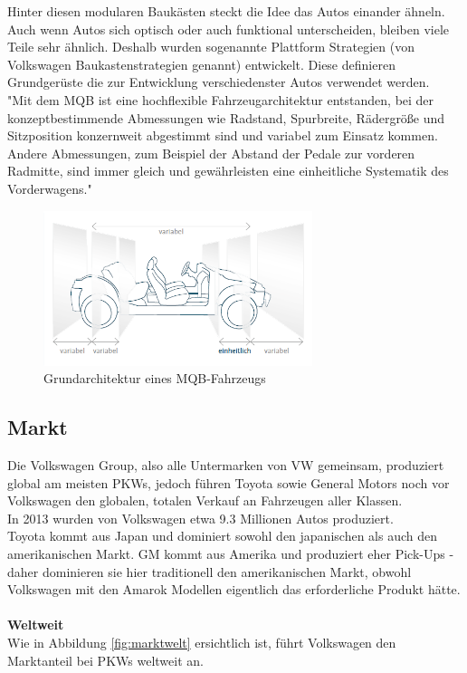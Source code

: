 \documentclass[12pt]{article}
\begin{document}
Hinter diesen modularen Baukästen steckt die Idee das Autos einander ähneln. Auch wenn Autos sich optisch oder auch funktional unterscheiden, bleiben viele Teile sehr ähnlich. Deshalb wurden sogenannte Plattform Strategien (von Volkswagen Baukastenstrategien genannt) entwickelt. Diese definieren Grundgerüste die zur Entwicklung verschiedenster Autos verwendet werden. \\ "Mit dem MQB ist eine hochflexible Fahrzeugarchitektur entstanden, bei der konzeptbestimmende Abmessungen wie Radstand, Spurbreite, Rädergröße und Sitzposition konzernweit abgestimmt sind und variabel zum Einsatz kommen. Andere Abmessungen, zum Beispiel der Abstand der Pedale zur vorderen Radmitte, sind immer gleich und gewährleisten eine einheitliche Systematik des Vorderwagens."\cite{mqb}
\FloatBarrier
\begin{figure}[here!]
	\centering
	\includegraphics[width=0.7\textwidth]{images/MQB2}
	\caption{Grundarchitektur eines MQB-Fahrzeugs \cite{mqbdefault}}
\end{figure}\FloatBarrier
\newpage\newpage
\subsection{Markt}
Die Volkswagen Group, also alle Untermarken von VW gemeinsam, produziert global am meisten PKWs, jedoch führen Toyota sowie General Motors noch vor Volkswagen den globalen, totalen Verkauf an Fahrzeugen aller Klassen. \\
In 2013 wurden von Volkswagen etwa 9.3 Millionen Autos produziert. \\
Toyota kommt aus Japan und dominiert sowohl den japanischen als auch den amerikanischen Markt. GM kommt aus Amerika und produziert eher Pick-Ups - daher dominieren sie hier traditionell den amerikanischen Markt, obwohl Volkswagen mit den Amarok Modellen eigentlich das erforderliche Produkt hätte. 
\\\\\textbf{Weltweit}\\
Wie in Abbildung \ref{fig:marktwelt} ersichtlich ist, führt Volkswagen den Marktanteil bei PKWs weltweit an. 
\end{document}
